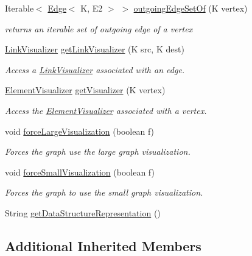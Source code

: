 \begin{DoxyCompactItemize}
Iterable$<$ \hyperlink{classbridges_1_1base_1_1_edge}{Edge}$<$ K, E2 $>$ $>$ \hyperlink{classbridges_1_1base_1_1_graph_adj_list_a084693f2f464b8f1d21d5ed2a864bf46}{outgoing\+Edge\+Set\+Of} (K vertex)
\begin{DoxyCompactList}\small\item\em returns an iterable set of outgoing edge of a vertex \end{DoxyCompactList}\item 
\hyperlink{classbridges_1_1base_1_1_link_visualizer}{Link\+Visualizer} \hyperlink{classbridges_1_1base_1_1_graph_adj_list_af93888dbd2a768a2401619ad5dc95560}{get\+Link\+Visualizer} (K src, K dest)
\begin{DoxyCompactList}\small\item\em Access a \hyperlink{classbridges_1_1base_1_1_link_visualizer}{Link\+Visualizer} associated with an edge. \end{DoxyCompactList}\item 
\hyperlink{classbridges_1_1base_1_1_element_visualizer}{Element\+Visualizer} \hyperlink{classbridges_1_1base_1_1_graph_adj_list_aafb45833cd5c13b6ce9bdece3fefde6a}{get\+Visualizer} (K vertex)
\begin{DoxyCompactList}\small\item\em Access the \hyperlink{classbridges_1_1base_1_1_element_visualizer}{Element\+Visualizer} associated with a vertex. \end{DoxyCompactList}\item 
void \hyperlink{classbridges_1_1base_1_1_graph_adj_list_a0e2dff032458bb03cb778b571ddcc9b6}{force\+Large\+Visualization} (boolean f)
\begin{DoxyCompactList}\small\item\em Forces the graph use the large graph visualization. \end{DoxyCompactList}\item 
void \hyperlink{classbridges_1_1base_1_1_graph_adj_list_ae14e51214742db0c4dab26c1d409f4ed}{force\+Small\+Visualization} (boolean f)
\begin{DoxyCompactList}\small\item\em Forces the graph to use the small graph visualization. \end{DoxyCompactList}\item 
String \hyperlink{classbridges_1_1base_1_1_graph_adj_list_a9bba66056cdf24197c41fff455e19a6c}{get\+Data\+Structure\+Representation} ()
\end{DoxyCompactItemize}
\subsection*{Additional Inherited Members}


